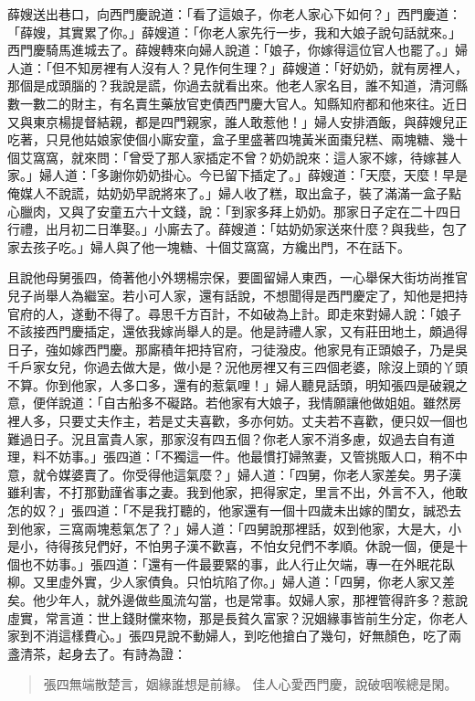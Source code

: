 薛嫂送出巷口，向西門慶說道：「看了這娘子，你老人家心下如何？」西門慶道：「薛嫂，其實累了你。」薛嫂道：「你老人家先行一步，我和大娘子說句話就來。」西門慶騎馬進城去了。薛嫂轉來向婦人說道：「娘子，你嫁得這位官人也罷了。」婦人道：「但不知房裡有人沒有人？見作何生理？」薛嫂道：「好奶奶，就有房裡人，那個是成頭腦的？我說是謊，你過去就看出來。他老人家名目，誰不知道，清河縣數一數二的財主，有名賣生藥放官吏債西門慶大官人。知縣知府都和他來往。近日又與東京楊提督結親，都是四門親家，誰人敢惹他！」婦人安排酒飯，與薛嫂兒正吃著，只見他姑娘家使個小廝安童，盒子里盛著四塊黃米面棗兒糕、兩塊糖、幾十個艾窩窩，就來問：「曾受了那人家插定不曾？奶奶說來：這人家不嫁，待嫁甚人家。」婦人道：「多謝你奶奶掛心。今已留下插定了。」薛嫂道：「天麼，天麼！早是俺媒人不說謊，姑奶奶早說將來了。」婦人收了糕，取出盒子，裝了滿滿一盒子點心臘肉，又與了安童五六十文錢，說：「到家多拜上奶奶。那家日子定在二十四日行禮，出月初二日準娶。」小廝去了。薛嫂道：「姑奶奶家送來什麼？與我些，包了家去孩子吃。」婦人與了他一塊糖、十個艾窩窩，方纔出門，不在話下。

且說他母舅張四，倚著他小外甥楊宗保，要圖留婦人東西，一心舉保大街坊尚推官兒子尚舉人為繼室。若小可人家，還有話說，不想聞得是西門慶定了，知他是把持官府的人，遂動不得了。尋思千方百計，不如破為上計。即走來對婦人說：「娘子不該接西門慶插定，還依我嫁尚舉人的是。他是詩禮人家，又有莊田地土，頗過得日子，強如嫁西門慶。那廝積年把持官府，刁徒潑皮。他家見有正頭娘子，乃是吳千戶家女兒，你過去做大是，做小是？況他房裡又有三四個老婆，除沒上頭的丫頭不算。你到他家，人多口多，還有的惹氣哩！」婦人聽見話頭，明知張四是破親之意，便佯說道：「自古船多不礙路。若他家有大娘子，我情願讓他做姐姐。雖然房裡人多，只要丈夫作主，若是丈夫喜歡，多亦何妨。丈夫若不喜歡，便只奴一個也難過日子。況且富貴人家，那家沒有四五個？你老人家不消多慮，奴過去自有道理，料不妨事。」張四道：「不獨這一件。他最慣打婦煞妻，又管挑販人口，稍不中意，就令媒婆賣了。你受得他這氣麼？」婦人道：「四舅，你老人家差矣。男子漢雖利害，不打那勤謹省事之妻。我到他家，把得家定，里言不出，外言不入，他敢怎的奴？」張四道：「不是我打聽的，他家還有一個十四歲未出嫁的閨女，誠恐去到他家，三窩兩塊惹氣怎了？」婦人道：「四舅說那裡話，奴到他家，大是大，小是小，待得孩兒們好，不怕男子漢不歡喜，不怕女兒們不孝順。休說一個，便是十個也不妨事。」張四道：「還有一件最要緊的事，此人行止欠端，專一在外眠花臥柳。又里虛外實，少人家債負。只怕坑陷了你。」婦人道：「四舅，你老人家又差矣。他少年人，就外邊做些風流勾當，也是常事。奴婦人家，那裡管得許多？惹說虛實，常言道：世上錢財儻來物，那是長貧久富家？況姻緣事皆前生分定，你老人家到不消這樣費心。」張四見說不動婦人，到吃他搶白了幾句，好無顏色，吃了兩盞清茶，起身去了。有詩為證：
\begin{quote}
張四無端散楚言，姻緣誰想是前緣。
佳人心愛西門慶，說破咽喉總是閑。
\end{quote}

